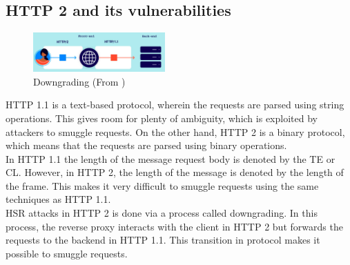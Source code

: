 \documentclass[conference]{IEEEtran}
\begin{document}
\subsection*{HTTP 2 and its vulnerabilities}
\begin{figure}[h]
	\centering
	\includegraphics[width=0.45\textwidth]{results/downgrade_flow.png}
	\caption{Downgrading (From \cite{dgrade})}
	\label{fig:smuggling}
\end{figure}
HTTP 1.1 is a text-based protocol, wherein the requests are parsed using string operations. This gives room for plenty of ambiguity, which is exploited by attackers to smuggle requests. On the other hand, HTTP 2 is a binary protocol, which means that the requests are parsed using binary operations. \\

In HTTP 1.1 the length of the message request body is denoted by the TE or CL. However, in HTTP 2, the length of the message is denoted by the length of the frame. This makes it very difficult to smuggle requests using the same techniques as HTTP 1.1. \\

HSR attacks in HTTP 2 is done via a process called downgrading. In this process, the reverse proxy interacts with the client in HTTP 2 but forwards the requests to the backend in HTTP 1.1. This transition in protocol makes it possible to smuggle requests. \\
\end{document}
